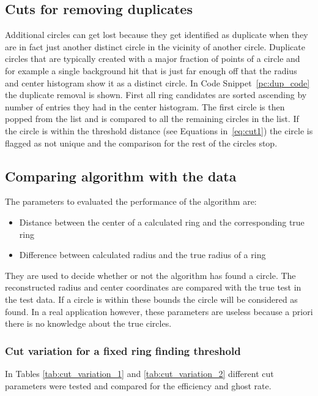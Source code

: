 \documentclass[11pt]{scrreprt}
\begin{document}

\subsection{Cuts for removing duplicates} %
\label{sub:different_cuts_for_circle_selection}

Additional circles can get lost because they get identified as duplicate when they are in fact just another distinct circle in 
the vicinity of another circle. Duplicate circles that are typically created with a major fraction of points of a circle and for 
example a single background hit that is just far enough off that the radius and center histogram show it as a distinct circle. 
In Code Snippet~\ref{pc:dup_code} the duplicate removal is shown. First all ring candidates are sorted ascending by number of 
entries they had in the center histogram. The first circle is then popped from the list and is compared to all the remaining circles 
in the list. If the circle is within the threshold distance (see Equations in~\ref{eq:cut1}) the circle is flagged as not unique and 
the comparison for the rest of the circles stop. 

\subsection{Comparing algorithm with the data}

The parameters to evaluated the performance of the algorithm are:
\begin{itemize}
	\item Distance between the center of a calculated ring and the corresponding true ring
	\item Difference between calculated radius and the true radius of a ring
\end{itemize}
They are used to decide whether or not the algorithm has found a circle. The reconstructed radius and center coordinates are compared with the true test in the test data. If a circle is within these bounds the circle will be considered as found. In a real application
however, these parameters are useless because a priori there is no knowledge about the true circles.

\subsubsection{Cut variation for a fixed ring finding threshold} %
\label{ssub:cut_variation_for_a_fixed_threshold}
In Tables \ref{tab:cut_variation_1} and \ref{tab:cut_variation_2} different cut parameters were tested
and compared for the efficiency and ghost rate.
\end{document}
